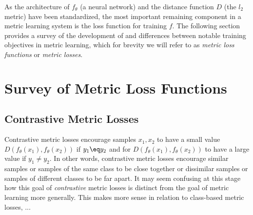 \documentclass[./dissertation.tex]{subfiles}
\begin{document}
    As the architecture of $f_{\theta}$ (a neural network) and the distance function $D$ (the $l_{2}$ metric) have been standardized, the most important remaining component in a metric learning system is the loss function for training $f$. The following section provides a survey of the development of and differences between notable training objectives in metric learning, which for brevity we will refer to as \textit{metric loss functions} or \textit{metric losses}.
    
    \section{Survey of Metric Loss Functions}
    
    \subsection{Contrastive Metric Losses}
    Contrastive metric losses encourage samples $x_{1}, x_{2}$ to have a small value $D(f_{\theta}(x_{1}), f_{\theta}(x_{2}))$ if $y_1 \eq y_2$ and for  $D(f_{\theta}(x_{1}), f_{\theta}(x_{2}))$ to have a large value if $y_1 \neq y_2$. In other words, contrastive metric losses encourage similar samples or samples of the same class to be close together or dissimilar samples or samples of different classes to be far apart. It may seem confusing at this stage how this goal of \textit{contrastive} metric losses is distinct from the goal of metric learning more generally. This makes more sense in relation to class-based metric losses, ... \\
    
\end{document}
